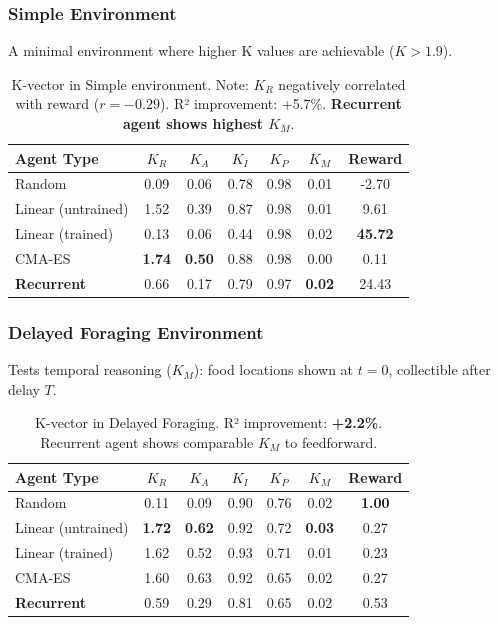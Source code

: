 \documentclass[11pt,a4paper]{article}
\newcommand{\kr}{K_R}
\newcommand{\ka}{K_A}
\newcommand{\ki}{K_I}
\newcommand{\kp}{K_P}
\newcommand{\km}{K_M}
\begin{document}
\subsubsection{Simple Environment}

A minimal environment where higher K values are achievable ($K > 1.9$).

\begin{table}[h]
\centering
\begin{tabular}{lcccccc}
\toprule
\textbf{Agent Type} & $\kr$ & $\ka$ & $\ki$ & $\kp$ & $\km$ & \textbf{Reward} \\
\midrule
Random & 0.09 & 0.06 & 0.78 & 0.98 & 0.01 & -2.70 \\
Linear (untrained) & 1.52 & 0.39 & 0.87 & 0.98 & 0.01 & 9.61 \\
Linear (trained) & 0.13 & 0.06 & 0.44 & 0.98 & 0.02 & \textbf{45.72} \\
CMA-ES & \textbf{1.74} & \textbf{0.50} & 0.88 & 0.98 & 0.00 & 0.11 \\
\textbf{Recurrent} & 0.66 & 0.17 & 0.79 & 0.97 & \textbf{0.02} & 24.43 \\
\bottomrule
\end{tabular}
\caption{K-vector in Simple environment. Note: $\kr$ negatively correlated with reward ($r = -0.29$). R² improvement: +5.7\%. \textbf{Recurrent agent shows highest $\km$}.}
\label{tab:simple-results}
\end{table}

\subsubsection{Delayed Foraging Environment}

Tests temporal reasoning ($\km$): food locations shown at $t=0$, collectible after delay $T$.

\begin{table}[h]
\centering
\begin{tabular}{lcccccc}
\toprule
\textbf{Agent Type} & $\kr$ & $\ka$ & $\ki$ & $\kp$ & $\km$ & \textbf{Reward} \\
\midrule
Random & 0.11 & 0.09 & 0.90 & 0.76 & 0.02 & \textbf{1.00} \\
Linear (untrained) & \textbf{1.72} & \textbf{0.62} & 0.92 & 0.72 & \textbf{0.03} & 0.27 \\
Linear (trained) & 1.62 & 0.52 & 0.93 & 0.71 & 0.01 & 0.23 \\
CMA-ES & 1.60 & 0.63 & 0.92 & 0.65 & 0.02 & 0.27 \\
\textbf{Recurrent} & 0.59 & 0.29 & 0.81 & 0.65 & 0.02 & 0.53 \\
\bottomrule
\end{tabular}
\caption{K-vector in Delayed Foraging. R² improvement: \textbf{+2.2\%}. Recurrent agent shows comparable $\km$ to feedforward.}
\label{tab:delayed-results}
\end{table}
\end{document}
